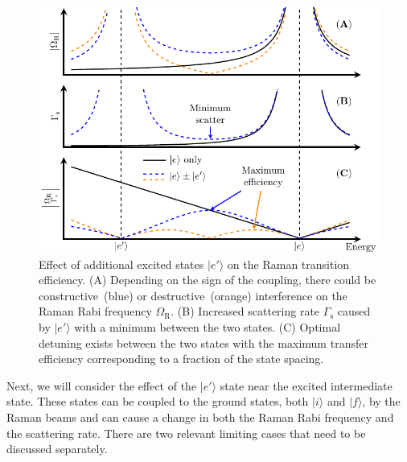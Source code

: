 \begin{figure}
  \centering
  \includegraphics[width=\textwidth]{figures/raman_transfer_extra_ext_states.pdf}
  \caption[Raman transition with additional excited states]{
    Effect of additional excited states $|e'\rangle$ on the Raman transition efficiency.
    (A) Depending on the sign of the coupling, there could be constructive~(blue)
    or destructive~(orange) interference on the Raman Rabi frequency $\Omega_{\mathrm{R}}$.
    (B) Increased scattering rate $\Gamma_{\mathrm{s}}$ caused by $|e'\rangle$ with a minimum
    between the two states.
    (C) Optimal detuning exists between the two states with the maximum transfer efficiency
    corresponding to a fraction of the state spacing.
    \label{fig:raman-transfer:raman:extra-ext-states}}
\end{figure}

Next, we will consider the effect of the $|e'\rangle$ state near the excited intermediate state.
These states can be coupled to the ground states, both $|i\rangle$ and $|f\rangle$,
by the Raman beams and can cause a change in both the Raman Rabi frequency
and the scattering rate.
There are two relevant limiting cases that need to be discussed separately.

